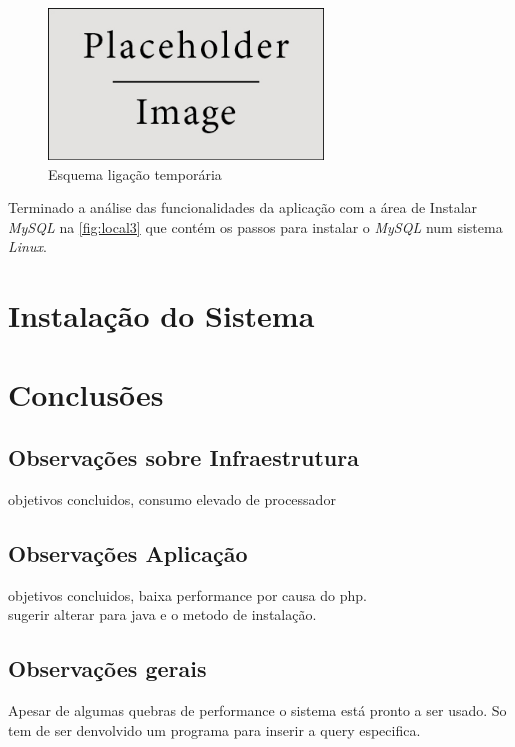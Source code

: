 \documentclass[11pt,twoside,a4paper]{report}
\begin{document}
\begin{figure}[H]
	\begin{center}
		\includegraphics[width=0.65\textwidth]{placeholder} %
		\caption{Esquema ligação temporária}
		\label{fig:local5}
	\end{center}
\end{figure}
Terminado a análise das funcionalidades da aplicação com a área de Instalar \textit{MySQL} na \autoref{fig:local3} que contém os passos para instalar o \textit{MySQL} num sistema \textit{Linux}.

\cleardoublepage
\chapter{Instalação do Sistema}

\cleardoublepage
\chapter{Conclusões}
\section{Observações sobre Infraestrutura}
objetivos concluidos, consumo elevado de processador

\section{Observações Aplicação}
objetivos concluidos, baixa performance por causa do php.\\
sugerir alterar para java e o metodo de instalação.

\section{Observações gerais}
Apesar de algumas quebras de performance o sistema está pronto a ser usado. So tem de ser denvolvido um programa para inserir a query especifica.
\end{document}
